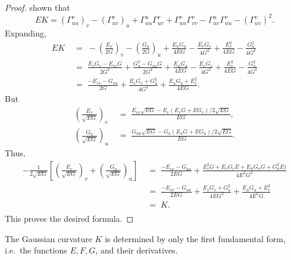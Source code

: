 \documentclass[11pt]{article}
\theoremstyle{definition}
\theoremstyle{remark}
\numberwithin{equation}{section}
\begin{document}
\begin{proof}
        shown that \[
            EK = (\Gamma_{uu}^v)_v - (\Gamma_{uv}^v)_u +
            \Gamma_{uu}^u\Gamma_{uv}^v + \Gamma_{uu}^v\Gamma_{vv}^v -
            \Gamma_{uv}^u\Gamma_{uu}^v - (\Gamma_{uv}^v)^2.
        \] Expanding, \begin{align*}
            EK \;&=\; -\left(\frac{E_v}{2G}\right)_v - \left(\frac{G_u}{2G}\right)_u +
            \frac{E_uG_u}{4EG} - \frac{E_vG_v}{4G^2} + \frac{E_v^2}{4EG} -
            \frac{G_u^2}{4G^2} \\
            \;&=\; \frac{E_vG_v - E_{vv}G}{2G^2} + \frac{G_{u}^2 - G_{uu}G}{2G^2} +
            \frac{E_uG_u}{4EG} - \frac{E_vG_v}{4G^2} + \frac{E_v^2}{4EG} -
            \frac{G_u^2}{4G^2} \\
            \;&=\; \frac{-E_{vv} - G_{uu}}{2G} + \frac{E_vG_v + G_u^2}{4G^2} +
            \frac{E_uG_u + E_v^2}{4EG}.
        \end{align*}
        But \begin{align*}
            \left(\frac{E_v}{\sqrt{EG}}\right)_v \;&=\; \frac{E_{vv}\sqrt{EG} -
            E_v(E_vG + EG_v)/2\sqrt{EG}}{EG}, \\
            \left(\frac{G_u}{\sqrt{EG}}\right)_u \;&=\; \frac{G_{uu}\sqrt{EG} -
            G_u(E_uG + EG_u)/2\sqrt{EG}}{EG}.
        \end{align*}
        Thus, \begin{align*}
            -\frac{1}{2\sqrt{EG}}\left[\left(\frac{E_v}{\sqrt{EG}}\right)_v +
            \left(\frac{G_u}{\sqrt{EG}}\right)_u\right]
            \;&=\; \frac{-E_{vv} - G_{uu}}{2EG} + \frac{E_v^2G + E_vG_vE + E_uG_uG +
            G_u^2E)}{4E^2G^2} \\
            \;&=\; \frac{-E_{vv} - G_{uu}}{2EG} + \frac{E_vG_v + G_u^2}{4EG^2} +
            \frac{E_uG_u + E_v^2}{4E^2G} \\
            \;&=\; K. \\
        \end{align*}
        This proves the desired formula.
    \end{proof}

    \begin{theorem}
        The Gaussian curvature $K$ is determined by only the first fundamental form,
        i.e.\ the functions $E, F, G$, and their derivatives.
    \end{theorem}
\end{document}
